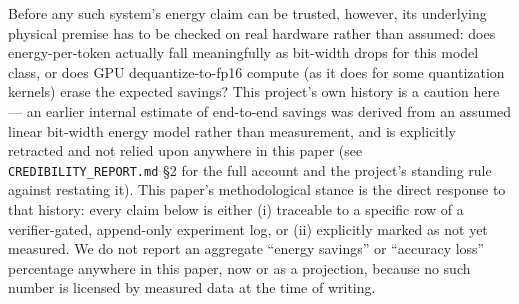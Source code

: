 \documentclass[conference]{IEEEtran}
\begin{document}
Before any such system's energy claim can be trusted, however, its
underlying physical premise has to be checked on real hardware rather than
assumed: does energy-per-token actually fall meaningfully as bit-width
drops for this model class, or does GPU dequantize-to-fp16 compute (as it
does for some quantization kernels) erase the expected savings? This
project's own history is a caution here --- an earlier internal estimate
of end-to-end savings was derived from an assumed linear bit-width energy
model rather than measurement, and is explicitly retracted and not relied
upon anywhere in this paper (see \texttt{CREDIBILITY\_REPORT.md} \S 2 for
the full account and the project's standing rule against restating it).
This paper's methodological stance is the direct response to that
history: every claim below is either (i) traceable to a specific row of a
verifier-gated, append-only experiment log, or (ii) explicitly marked as
not yet measured. We do not report an aggregate ``energy savings'' or
``accuracy loss'' percentage anywhere in this paper, now or as a
projection, because no such number is licensed by measured data at the
time of writing.
\end{document}
